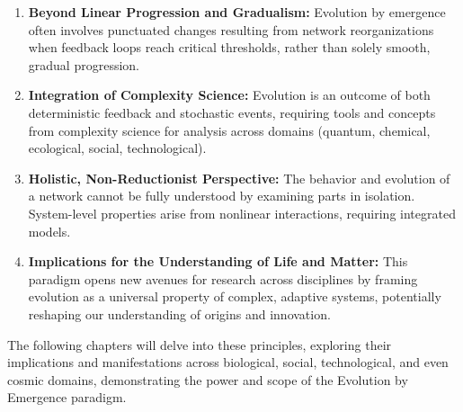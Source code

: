 \begin{enumerate}
    \item \textbf{Beyond Linear Progression and Gradualism:} Evolution by emergence often involves punctuated changes resulting from network reorganizations when feedback loops reach critical thresholds, rather than solely smooth, gradual progression.

    \item \textbf{Integration of Complexity Science:} Evolution is an outcome of both deterministic feedback and stochastic events, requiring tools and concepts from complexity science for analysis across domains (quantum, chemical, ecological, social, technological).

    \item \textbf{Holistic, Non-Reductionist Perspective:} The behavior and evolution of a network cannot be fully understood by examining parts in isolation. System-level properties arise from nonlinear interactions, requiring integrated models.

    \item \textbf{Implications for the Understanding of Life and Matter:} This paradigm opens new avenues for research across disciplines by framing evolution as a universal property of complex, adaptive systems, potentially reshaping our understanding of origins and innovation.
\end{enumerate}

The following chapters will delve into these principles, exploring their implications and manifestations across biological, social, technological, and even cosmic domains, demonstrating the power and scope of the Evolution by Emergence paradigm. %
\cleardoublepage
